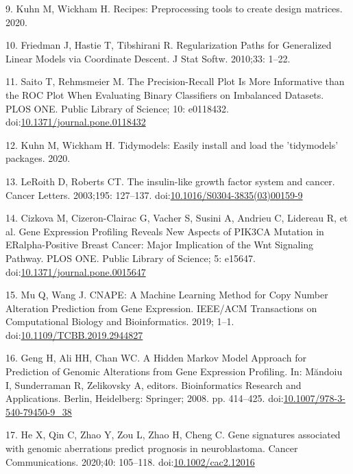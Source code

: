 \documentclass[10pt,letterpaper]{article}
\begin{document}
\leavevmode\hypertarget{ref-kuhnRecipesPreprocessingTools2020}{}%
9. Kuhn M, Wickham H. Recipes: Preprocessing tools to create design
matrices. 2020.

\leavevmode\hypertarget{ref-friedmanRegularizationPathsGeneralized2010}{}%
10. Friedman J, Hastie T, Tibshirani R. Regularization Paths for
Generalized Linear Models via Coordinate Descent. J Stat Softw. 2010;33:
1--22.

\leavevmode\hypertarget{ref-saitoPrecisionRecallPlotMore2015}{}%
11. Saito T, Rehmsmeier M. The Precision-Recall Plot Is More Informative
than the ROC Plot When Evaluating Binary Classifiers on Imbalanced
Datasets. PLOS ONE. Public Library of Science; 10: e0118432.
doi:\href{https://doi.org/10.1371/journal.pone.0118432}{10.1371/journal.pone.0118432}

\leavevmode\hypertarget{ref-kuhnTidymodelsEasilyInstall2020}{}%
12. Kuhn M, Wickham H. Tidymodels: Easily install and load the
'tidymodels' packages. 2020.

\leavevmode\hypertarget{ref-leroithInsulinlikeGrowthFactor2003}{}%
13. LeRoith D, Roberts CT. The insulin-like growth factor system and
cancer. Cancer Letters. 2003;195: 127--137.
doi:\href{https://doi.org/10.1016/S0304-3835(03)00159-9}{10.1016/S0304-3835(03)00159-9}

\leavevmode\hypertarget{ref-cizkovaGeneExpressionProfiling2010}{}%
14. Cizkova M, Cizeron-Clairac G, Vacher S, Susini A, Andrieu C,
Lidereau R, et al. Gene Expression Profiling Reveals New Aspects of
PIK3CA Mutation in ERalpha-Positive Breast Cancer: Major Implication of
the Wnt Signaling Pathway. PLOS ONE. Public Library of Science; 5:
e15647.
doi:\href{https://doi.org/10.1371/journal.pone.0015647}{10.1371/journal.pone.0015647}

\leavevmode\hypertarget{ref-muCNAPEMachineLearning2019}{}%
15. Mu Q, Wang J. CNAPE: A Machine Learning Method for Copy Number
Alteration Prediction from Gene Expression. IEEE/ACM Transactions on
Computational Biology and Bioinformatics. 2019; 1--1.
doi:\href{https://doi.org/10.1109/TCBB.2019.2944827}{10.1109/TCBB.2019.2944827}

\leavevmode\hypertarget{ref-gengHiddenMarkovModel2008}{}%
16. Geng H, Ali HH, Chan WC. A Hidden Markov Model Approach for
Prediction of Genomic Alterations from Gene Expression Profiling. In:
Măndoiu I, Sunderraman R, Zelikovsky A, editors. Bioinformatics Research
and Applications. Berlin, Heidelberg: Springer; 2008. pp. 414--425.
doi:\href{https://doi.org/10.1007/978-3-540-79450-9_38}{10.1007/978-3-540-79450-9\_38}

\leavevmode\hypertarget{ref-heGeneSignaturesAssociated2020}{}%
17. He X, Qin C, Zhao Y, Zou L, Zhao H, Cheng C. Gene signatures
associated with genomic aberrations predict prognosis in neuroblastoma.
Cancer Communications. 2020;40: 105--118.
doi:\href{https://doi.org/10.1002/cac2.12016}{10.1002/cac2.12016}

\nolinenumbers
\end{document}
